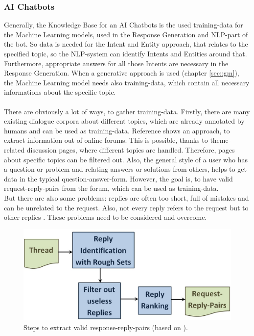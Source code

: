 \documentclass[10pt,final,journal,a4paper,oneside,twocolumn]{IEEEtran}
\begin{document}
\subsubsection{AI Chatbots}
Generally, the Knowledge Base for an AI Chatbots is the used training-data for the Machine Learning models, used in the Response Generation and NLP-part of the bot. So data is needed for the Intent and Entity approach, that relates to the specified topic, so the NLP-system can identify Intents and Entities around that. Furthermore, appropriate answers for all those Intents are necessary in the Response Generation. When a generative approach is used (chapter \ref{sec::gm}), the Machine Learning model needs also training-data, which contain all necessary informations about the specific topic.\\
\\
There are obviously a lot of ways, to gather training-data. Firstly, there are many existing dialogue corpora about different topics, which are already annotated by humans and can be used as training-data. Reference \cite{b15} shows an approach, to extract information out of online forums. This is possible, thanks to theme-related discussion pages, where different topics are handled. Therefore, pages about specific topics can be filtered out. Also, the general style of a user who has a question or problem and relating answers or solutions from others, helps to get data in the typical question-answer-form. However, the goal is, to have valid request-reply-pairs from the forum, which can be used as training-data. \\
But there are also some problems: replies are often too short, full of mistakes and can be unrelated to the request. Also, not every reply refers to the request but to other replies \cite{b15}. These problems need to be considered and overcome.
\begin{figure}[htbp]
	\centerline{\includegraphics[width=1\linewidth]{pictures/ki_knowledge.jpg}}
	\caption{Steps to extract valid response-reply-pairs (based on \cite{b6}).}
	\label{kiknow}
\end{figure}
\end{document}
